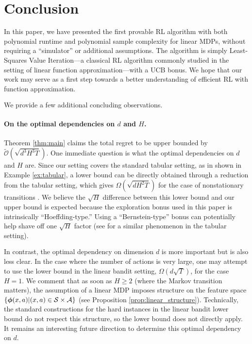 

\section{Conclusion} \label{sec:discussion}

In this paper, we have presented the first provable RL algorithm with both polynomial runtime and polynomial sample complexity for linear MDPs, without requiring a ``simulator'' or additional assumptions. The algorithm is simply Least-Squares Value Iteration---a classical RL algorithm
commonly studied in the setting of linear function approximation---with a UCB bonus. We hope that our work may serve as a first step towards a better understanding of efficient RL with function approximation.

We provide a few additional concluding observations.

\paragraph{On the optimal dependencies on $d$ and $H$.} Theorem \ref{thm:main} claims the total regret to be upper bounded by $\tilde{\mathcal{O}}(\sqrt{d^3H^3T})$. One immediate question is what the optimal dependencies on $d$ and $H$ are. Since our setting covers the standard tabular setting, as in shown in Example \ref{ex:tabular}, a lower bound can be directly obtained through a reduction from the tabular setting, which gives $\Omega(\sqrt{dH^2T})$ for the case of nonstationary transitions \cite{jin2018q}. We believe the $\sqrt{H}$ difference between this lower bound and our upper bound is expected because the exploration bonus used in this paper is intrinsically ``Hoeffding-type.'' Using a ``Bernstein-type'' bonus can potentially help shave off one $\sqrt{H}$ factor (see \cite{azar2017minimax,jin2018q} for a similar phenomenon in the tabular setting).

In contrast, the optimal dependency on dimension $d$ is more important but is also less clear. In the case where the number of actions is very large, one may attempt to use the lower bound in the linear bandit setting, $\Omega(d\sqrt{T})$, for the case $H=1$. We comment that as soon as $H\ge 2$ (where the Markov transition matters), the assumption of a linear MDP imposes structure on the feature space $\{\bm{\phi}(x, a)|(x, a) \in \mathcal{S} \times\mathcal{A}\}$ (see Proposition \ref{prop:linear_structure}). Technically, the standard constructions for the hard instances in the linear bandit lower bound do not respect this structure, so the lower bound does not directly apply.  
It remains an interesting future direction to determine this optimal dependency on $d$.

